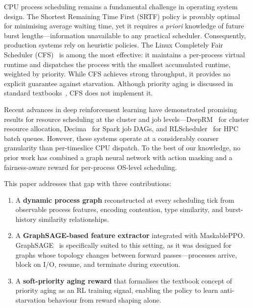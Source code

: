 \documentclass[conference]{IEEEtran}
\begin{document}
CPU process scheduling remains a fundamental challenge in operating
system design.  The Shortest Remaining Time First (SRTF) policy is
provably optimal for minimising average waiting time, yet it requires
\emph{a priori} knowledge of future burst lengths---information
unavailable to any practical scheduler.  Consequently, production
systems rely on heuristic policies.  The Linux Completely Fair Scheduler
(CFS)~\cite{cfs} is among the most effective: it maintains a per-process
virtual runtime and dispatches the process with the smallest accumulated
runtime, weighted by priority.  While CFS achieves strong throughput, it
provides no explicit guarantee against starvation.  Although priority
aging is discussed in standard
textbooks~\cite{ostep,silberschatz}, CFS does not implement it.

Recent advances in deep reinforcement learning have demonstrated
promising results for resource scheduling at the cluster and job
levels---DeepRM~\cite{deeprm} for cluster resource allocation,
Decima~\cite{decima} for Spark job DAGs, and
RLScheduler~\cite{rls} for HPC batch queues.  However, these systems
operate at a considerably coarser granularity than per-timeslice CPU
dispatch.  To the best of our knowledge, no prior work has combined a
graph neural network with action masking and a fairness-aware reward for
per-process OS-level scheduling.

This paper addresses that gap with three contributions:

\begin{enumerate}
  \item A \textbf{dynamic process graph} reconstructed at every
  scheduling tick from observable process features, encoding contention,
  type similarity, and burst-history similarity relationships.

  \item A \textbf{GraphSAGE-based feature extractor} integrated with
  MaskablePPO.  GraphSAGE~\cite{graphsage} is specifically suited to
  this setting, as it was designed for graphs whose topology changes
  between forward passes---processes arrive, block on I/O, resume, and
  terminate during execution.

  \item A \textbf{soft-priority aging reward} that formalises the
  textbook concept of priority aging as an RL training signal, enabling
  the policy to learn anti-starvation behaviour from reward shaping
  alone.
\end{enumerate}
\end{document}
